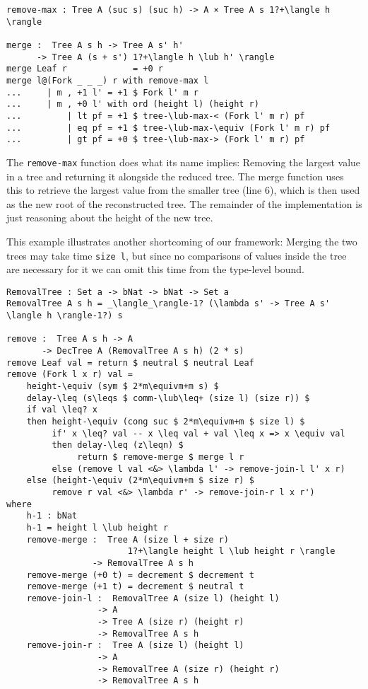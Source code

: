 \begin{lstlisting}[caption={Tree merge},label={lst:tree:merge},emph={Tree,Fork,Leaf,merge,remove,max}]
remove-max : Tree A (suc s) (suc h) -> A × Tree A s 1?+\langle h \rangle

merge :  Tree A s h -> Tree A s' h'
      -> Tree A (s + s') 1?+\langle h \lub h' \rangle
merge Leaf r             = +0 r
merge l@(Fork _ _ _) r with remove-max l
...     | m , +1 l' = +1 $ Fork l' m r
...     | m , +0 l' with ord (height l) (height r)
...         | lt pf = +1 $ tree-\lub-max-< (Fork l' m r) pf
...         | eq pf = +1 $ tree-\lub-max-\equiv (Fork l' m r) pf
...         | gt pf = +0 $ tree-\lub-max-> (Fork l' m r) pf

\end{lstlisting}

The \texttt{remove-max} function does what its name implies: Removing the largest value in a tree and returning it alongside the reduced tree. The merge function uses this to retrieve the largest value from the smaller tree (line 6), which is then used as the new root of the reconstructed tree. The remainder of the implementation is just reasoning about the height of the new tree.

This example illustrates another shortcoming of our framework: Merging the two trees may take time \texttt{size l}, but since no comparisons of values inside the tree are necessary for it we can omit this time from the type-level bound.

\begin{lstlisting}[caption={Tree removal},label={lst:tree:removal},emph={Tree,Fork,Leaf,RemovalTree,return,if,then,else,neutral,decrement,remove}]
RemovalTree : Set a -> bNat -> bNat -> Set a
RemovalTree A s h = _\langle_\rangle-1? (\lambda s' -> Tree A s' \langle h \rangle-1?) s

remove :  Tree A s h -> A
       -> DecTree A (RemovalTree A s h) (2 * s)
remove Leaf val = return $ neutral $ neutral Leaf
remove (Fork l x r) val =
    height-\equiv (sym $ 2*m\equivm+m s) $
    delay-\leq (s\leqs $ comm-\lub\leq+ (size l) (size r)) $
    if val \leq? x
    then height-\equiv (cong suc $ 2*m\equivm+m $ size l) $
         if' x \leq? val -- x \leq val + val \leq x => x \equiv val
         then delay-\leq (z\leqn) $
              return $ remove-merge $ merge l r
         else (remove l val <&> \lambda l' -> remove-join-l l' x r)
    else (height-\equiv (2*m\equivm+m $ size r) $
         remove r val <&> \lambda r' -> remove-join-r l x r')
where
    h-1 : bNat
    h-1 = height l \lub height r
    remove-merge :  Tree A (size l + size r)
                        1?+\langle height l \lub height r \rangle
                 -> RemovalTree A s h
    remove-merge (+0 t) = decrement $ decrement t
    remove-merge (+1 t) = decrement $ neutral t
    remove-join-l :  RemovalTree A (size l) (height l)
                  -> A
                  -> Tree A (size r) (height r)
                  -> RemovalTree A s h
    remove-join-r :  Tree A (size l) (height l)
                  -> A
                  -> RemovalTree A (size r) (height r)
                  -> RemovalTree A s h
\end{lstlisting}


